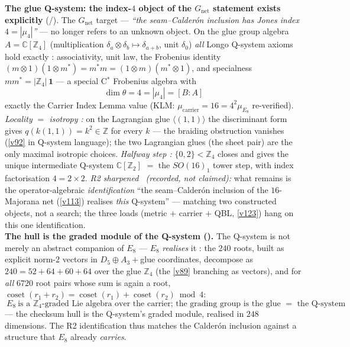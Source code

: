 \documentclass[11pt,a4paper]{article}
\newcommand{\Z}{\mathbb Z}
\begin{document}
\par\smallskip\noindent\textbf{The glue Q-system: the index-$4$ object of the $G_{\mathrm{net}}$ statement exists explicitly} (\mE/\mC).
The $G_{\mathrm{net}}$ target --- \emph{``the seam--Calder\'on inclusion has Jones index $4=|\mu_4|$''}
--- no longer refers to an unknown object. On the glue group algebra $A=\mathbb C[\Z_4]$ (multiplication
$\delta_a\otimes\delta_b\mapsto\delta_{a+b}$, unit $\delta_0$) \emph{all} Longo Q-system axioms hold
exactly \mE: associativity, unit law, the Frobenius identity
$(m\otimes1)(1\otimes m^*)=m^*m=(1\otimes m)(m^*\otimes1)$, and specialness $mm^*=|\Z_4|\,\mathbf1$ ---
a special C$^*$ Frobenius algebra with
\[
  \boxed{\ \dim\theta=4=|\mu_4|=[B:A]\ }
\]
exactly the Carrier Index Lemma value (KLM: $\mu_{\mathrm{carrier}}=16=4^2\mu_{E_8}$ re-verified).
\emph{Locality $=$ isotropy \mE:} on the Lagrangian glue $\langle(1,1)\rangle$ the discriminant form
gives $q(k(1,1))=k^2\in\Z$ for every $k$ --- the braiding obstruction vanishes (\vref{v92} in Q-system
language); the two Lagrangian glues (the sheet pair) are the only maximal isotropic choices.
\emph{Halfway step \mE:} $\{0,2\}<\Z_4$ closes and gives the unique intermediate Q-system
$\mathbb C[\Z_2]$ $=$ the $SO(16)_1$ tower step, with index factorisation $4=2\times2$. \emph{R2 sharpened
\mC\ (recorded, not claimed):} what remains is the operator-algebraic \emph{identification} ``the
seam--Calder\'on inclusion of the $16$-Majorana net (\vref{v113}) realises \emph{this} Q-system'' --- matching
two constructed objects, not a search; the three loads (metric $+$ carrier $+$ QBL, \vref{v123}) hang on this
one identification.
\smallskip\\
\noindent\textbf{The hull is the graded module of the Q-system ().} The
Q-system is not merely an abstract companion of $E_8$ --- $E_8$ \emph{realises} it \mE: the $240$
roots, built as explicit norm-$2$ vectors in $D_5\oplus A_3+$glue coordinates, decompose as
$240=52+64+60+64$ over the glue $\Z_4$ (the \vref{v89} branching as vectors), and for \emph{all} $6720$ root
pairs whose sum is again a root, $\operatorname{coset}(r_1{+}r_2)=\operatorname{coset}(r_1)+
\operatorname{coset}(r_2)\bmod4$:
\[
  \boxed{\ E_8\ \text{is a $\Z_4$-graded Lie algebra over the carrier; the grading group is the glue
  $=$ the Q-system}\ }
\]
--- the checksum hull is the Q-system's graded module, realised in $248$ dimensions. The R2
identification thus matches the Calder\'on inclusion against a structure that $E_8$ already
\emph{carries}. 
\end{document}
